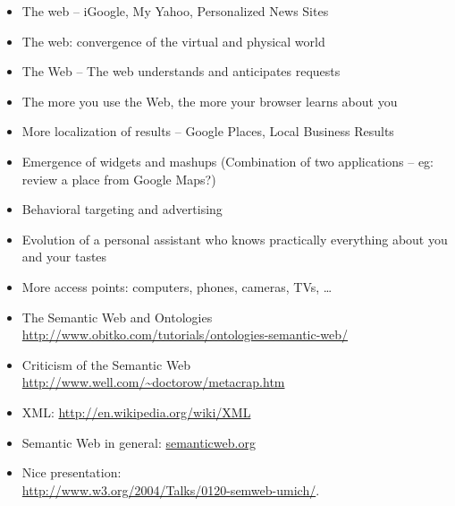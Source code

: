 \documentclass[a4paper,landscape,headrule,footrule,xetex]{foils}
\begin{document}
\begin{itemize} \addtolength{\itemsep}{-1.25ex}
\item  The  web – iGoogle, My Yahoo, Personalized News Sites
\item  The  web: convergence of the virtual and physical world
\item  The  Web – The web understands and anticipates requests
\item  The more you use the Web, the more your browser learns about you
\item  More localization of results – Google Places, Local Business Results
\item  Emergence of widgets and mashups (Combination of two applications – eg: review a place from Google Maps?)
\item  Behavioral targeting and advertising
\item  Evolution of a personal assistant who knows practically everything about you and your tastes
\item  More access points: computers, phones, cameras, TVs, \ldots
\end{itemize}








\MyLogo{}
\begin{itemize}
\item The Semantic Web and Ontologies
\\ \url{http://www.obitko.com/tutorials/ontologies-semantic-web/}
\item Criticism of the Semantic Web
\\ \url{http://www.well.com/~doctorow/metacrap.htm}
\item XML:  \url{http://en.wikipedia.org/wiki/XML}
\item Semantic Web in general: \url{semanticweb.org}
\item Nice presentation:  
\\ \url{http://www.w3.org/2004/Talks/0120-semweb-umich/}.
\end{itemize}

\end{document}
